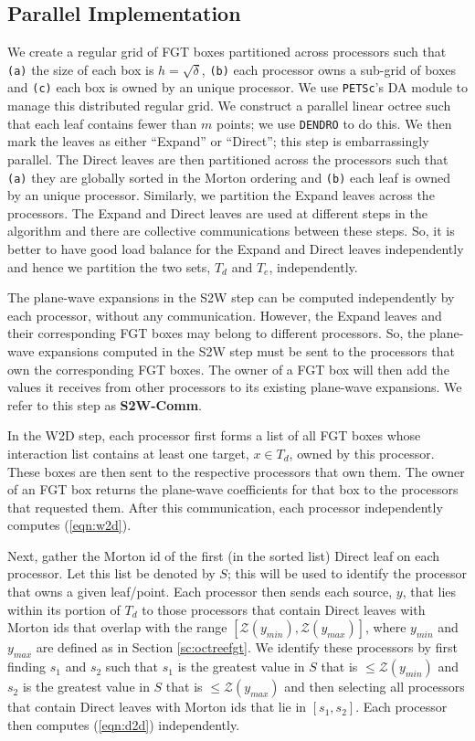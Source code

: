 
\subsection{Parallel Implementation}
\label{sc:parallelnufgt}

We create a regular grid of FGT boxes partitioned across processors such that 
 {\tt{(a)}} the size of each box is $h = \sqrt{\delta}$, {\tt{(b)}} each processor owns a sub-grid of boxes and
 {\tt{(c)}} each box is owned by an unique processor.  We use \texttt{PETSc}'s \cite{petsc-user-ref, petsc-home-page} DA
 module to manage this distributed regular grid. We construct a parallel linear octree such that each leaf
 contains fewer than $m$ points; we use \texttt{DENDRO} \cite{dendro} to do this. We then mark the leaves as either
 ``Expand'' or ``Direct''; this step is embarrassingly parallel. The Direct leaves are then partitioned across 
 the processors such that {\tt{(a)}} they are globally sorted in the Morton ordering and {\tt{(b)}} each leaf 
 is owned by an unique processor. Similarly, we partition the Expand leaves across the processors. The Expand
 and Direct leaves are used at different steps in the algorithm and there are collective communications between
 these steps. So, it is better to have good load balance for the Expand and Direct leaves independently and hence
 we partition the two sets, $T_d$ and $T_e$, independently.

The plane-wave expansions in the S2W step can be computed independently by each processor, without any communication.
However, the Expand leaves and their corresponding FGT boxes may belong to different processors. So, the plane-wave 
expansions computed in the S2W step must be sent to the processors that own the corresponding FGT boxes. The owner of
a FGT box will then add the values it receives from other processors to its existing plane-wave expansions. We 
refer to this step as {\textbf{S2W-Comm}}.

In the W2D step, each processor first forms a list of all FGT boxes whose interaction list contains at least one 
target, $x \in T_d$, owned by this processor. These boxes are then sent to the respective processors that own them. The
owner of an FGT box returns the plane-wave coefficients for that box to the processors that requested them. After this
communication, each processor independently computes (\ref{eqn:w2d}).

Next, gather the Morton id of the first (in the sorted list) Direct leaf on each processor. Let this list
be denoted by $S$; this will be used to identify the processor that owns a given leaf/point. Each 
processor then sends each source, $y$, that lies within its portion of $T_d$ to those processors 
that contain Direct leaves with Morton ids that overlap with the range $[\mathcal{Z}(y_{min}), \mathcal{Z}(y_{max})]$, where
 $y_{min}$ and $y_{max}$ are defined as in Section \ref{sc:octreefgt}. We identify these processors 
 by first finding $s_1$ and $s_2$ such that $s_1$ is the greatest value in $S$ that is $\leq \mathcal{Z}(y_{min})$ and 
 $s_2$ is the greatest value in $S$ that is $\leq \mathcal{Z}(y_{max})$ and then selecting all processors that contain
 Direct leaves with Morton ids that lie in $[s_1, s_2]$. Each processor then computes (\ref{eqn:d2d}) independently.

